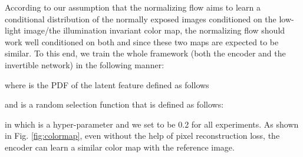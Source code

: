 \documentclass[letterpaper]{article} \usepackage{aaai22}  \usepackage{times}  \usepackage{helvet}  \usepackage{courier}  \usepackage[hyphens]{url}  \usepackage{graphicx} \urlstyle{rm} \def\UrlFont{\rm}  \usepackage{natbib}  \usepackage{caption} \usepackage{subfigure}
\newcommand{\wh}[1]{{#1}}
\begin{document}
According to our assumption that the normalizing flow aims to learn a conditional distribution of the normally exposed images conditioned on the low-light image/the illumination invariant color map, the normalizing flow should work well conditioned on both  and  since these two \wh{maps} are expected to be similar. To this end, we train the whole framework (both the encoder and the invertible network) in the following manner:

where  is the PDF of \wh{the} latent feature  defined as follows

and \wh{} is a random selection function that is defined as follows:

in which  is a hyper-parameter and we set  to be 0.2 for all experiments. As shown in Fig. \ref{fig:colormap}, even without the help of pixel reconstruction loss, the encoder  can learn a similar color map with the reference image.
\end{document}
